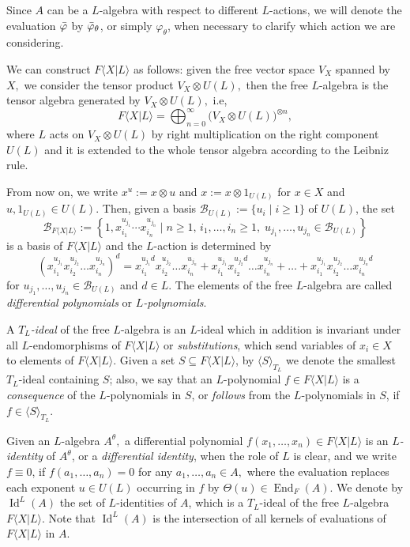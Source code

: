 \documentclass[a4paper,reqno]{amsart}
\theoremstyle{definition}
\numberwithin{equation}{section}
\numberwithin{theorem}{section}
\DeclareMathOperator{\I}{Id}
\newcommand{\FL}{F\langle X|L\rangle}
\DeclareMathOperator{\E}{End}
\begin{document}
Since $A$ can be a $L$-algebra with respect to different $L$-actions, we will denote the evaluation $\Bar{\varphi}$ by $\Bar{\varphi}_{\theta}$, or simply $\varphi_{\theta}$,  when necessary to clarify which action we are considering.




We can construct $\FL$ as follows: given the free vector space $V_X$ spanned by $X,$ we consider the tensor product $V_X\otimes U(L),$ then the free $L$-algebra is the tensor algebra generated by $V_X\otimes U(L),$ i.e,
$$
\FL=\bigoplus_{n=0}^\infty \big( V_X\otimes U(L) \big)^{\otimes n},
$$
where $L$ acts on $V_X\otimes U(L)$ by right multiplication on the right component $U(L)$ and it is extended to the whole tensor algebra according to the Leibniz rule.


From now on, we write  $x^u:=x\otimes u$ and $x:= x \otimes 1_{U(L)}$ for $x\in X$ and $u, 1_{U(L)}\in U(L).$ Then, given a basis $\mathcal{B}_{U(L)} :=\{u_i \mid i\geq 1 \}$ of $U(L)$, the set
$$
\mathcal{B}_{\FL}:=\left\{ 1,  x_{i_1}^{u_{j_1}}\cdots x_{i_n}^{u_{j_n}} \mid n\geq 1, \, i_1,\ldots,i_n\geq 1, \; u_{j_1},\ldots,u_{j_n}\in\mathcal{B}_{U(L)}\right\}
$$
is a basis of $\FL$ and the $L$-action is determined by
$$
(x_{i_{1}}^{u_{j_{1}}} x_{i_{2}}^{u_{j_{2}}}\dots x_{i_{n}}^{u_{j_{n}}})^d =x_{i_{1}}^{ u_{j_{1}}d} x_{i_{2}}^{u_{j_{2}}}\dots x_{i_{n}}^{u_{j_{n}}}+ x_{i_{1}}^{ u_{j_{1}}} x_{i_{2}}^{u_{j_{2}}d}\dots x_{i_{n}}^{u_{j_{n}}}+ \dots+x_{i_{1}}^{u_{j_{1}}} x_{i_{2}}^{u_{j_{2}}}\dots x_{i_{n}}^{u_{j_{n}}d}
$$
for $u_{j_1},\ldots,u_{j_n}\in\mathcal{B}_{U(L)}$ and $d\in L.$
The elements of the free $L$-algebra are called \emph{differential polynomials} or \emph{$L$-polynomials}. 

A \emph{$T_L$-ideal} of the free $L$-algebra is an $L$-ideal which in addition is invariant under all $L$-endomorphisms of $\FL$ or \emph{substitutions}, which send variables of $x_i\in X$ to elements of $\FL.$ Given a set $S\subseteq\FL$, by $\langle S\rangle_{T_L}$ we denote the smallest $T_L$-ideal containing $S$; also, we say that an $L$-polynomial $f\in\FL$ is a \emph{consequence} of the $L$-polynomials in $S$, or \emph{follows} from the $L$-polynomials in $S$, if $f\in \langle S \rangle_{T_L}$.



\smallskip 

Given an $L$-algebra  $A^{\theta},$  a differential polynomial $f(x_1, \dots, x_n)\in \FL$ is an \emph{$L$-identity} of $A^{\theta}$, or a \emph{differential identity}, when the role of $L$ is clear, and we write $f\equiv 0$, if $f(a_{1},\dots,a_{n})=0$ for any $a_1,\ldots,a_n\in A,$  where the evaluation replaces each exponent $u\in U(L)$ occurring in $f$ by $\Theta(u)\in\E_F(A)$. 
We denote by $\I^L(A)$ the set of $L$-identities of $A$, which is a $T_L$-ideal of the free $L$-algebra $\FL$. Note that $\I^L(A)$ is the intersection of all kernels of evaluations of $\FL$ in $A$.
\end{document}
